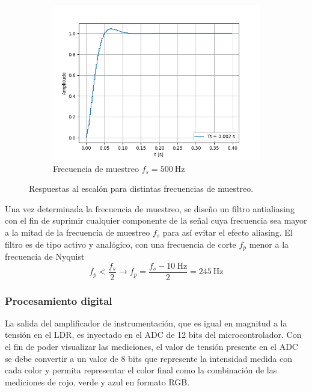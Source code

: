 \documentclass[12pt,a4paper,twoside,fleqn]{article}
\begin{document}
\begin{figure}
\begin{subfigure}{.45\textwidth}
        \includegraphics[width=\textwidth]{img/step_resp_500hz.png}
        \caption{Frecuencia de muestreo $f_s=\qty{500}{\Hz}$}
        \label{fig:step_resp_500}
    \end{subfigure}
    \caption{Respuestas al escalón para distintas frecuencias de muestreo.}
    \label{fig:step_resp}
\end{figure}

Una vez determinada la frecuencia de muestreo, se diseño un filtro antialiasing con el fin de suprimir cualquier componente de la señal cuya frecuencia sea mayor a la mitad de la frecuencia de muestreo $f_s$ para así evitar el efecto aliasing. El filtro es de tipo activo y analógico, con una frecuencia de corte $f_p$ menor a la frecuencia de Nyquist
\begin{equation*}
    f_p < \frac{f_s}{2} \longrightarrow f_p = \frac{f_s - \qty{10}{\Hz}}{2} = \qty{245}{\Hz}
\end{equation*}

\subsubsection*{Procesamiento digital}
La salida del amplificador de instrumentación, que es igual en magnitud a la tensión en el LDR, es inyectado en el ADC de 12 bits del microcontrolador. Con el fin de poder visualizar las mediciones, el valor de tensión presente en el ADC se debe convertir a un valor de 8 bits que represente la intensidad medida con cada color  y permita representar el color final como la combinación de las mediciones de rojo, verde y azul en formato RGB.
\end{document}
